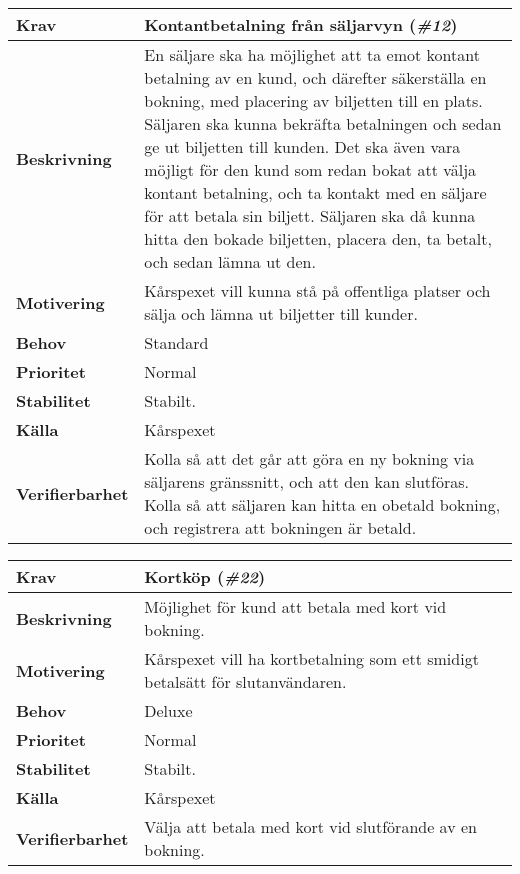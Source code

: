 \documentclass[a4paper, twoside, 11pt, titlepage]{article}
\begin{document}
		\begin{tabular} { p{2.6cm} p{12.5cm} }
			\hline
			\sffamily\textbf{Krav} & Kontantbetalning från säljarvyn (\emph{\#12})  \\
			\hline
			\sffamily\textbf{Beskrivning} & En säljare ska ha möjlighet att ta emot kontant betalning av en kund, och därefter säkerställa en bokning, med placering av biljetten till en plats. Säljaren ska kunna bekräfta betalningen och sedan ge ut biljetten till kunden. Det ska även vara möjligt för den kund som redan bokat att välja kontant betalning, och ta kontakt med en säljare för att betala sin biljett. Säljaren ska då kunna hitta den bokade biljetten, placera den, ta betalt, och sedan lämna ut den.  \\
			\hline
			\sffamily\textbf{Motivering} & Kårspexet vill kunna stå på offentliga platser och sälja och lämna ut biljetter till kunder.  \\
			\hline
			\sffamily\textbf{Behov} & Standard  \\
			\hline
			\sffamily\textbf{Prioritet} & Normal  \\
			\hline
			\sffamily\textbf{Stabilitet} & Stabilt.  \\
			\hline
			\sffamily\textbf{Källa} & Kårspexet  \\
			\hline
			\sffamily\textbf{Verifierbarhet} & Kolla så att det går att göra en ny bokning via säljarens gränssnitt, och att den kan slutföras. Kolla så att säljaren kan hitta en obetald bokning, och registrera att bokningen är betald.  \\
			\hline
		\end{tabular}
		\vspace{6mm}

		\begin{tabular} { p{2.6cm} p{12.5cm} }
			\hline
			\sffamily\textbf{Krav} & Kortköp (\emph{\#22})  \\
			\hline
			\sffamily\textbf{Beskrivning} & Möjlighet för kund att betala med kort vid bokning.  \\
			\hline
			\sffamily\textbf{Motivering} & Kårspexet vill ha kortbetalning som ett smidigt betalsätt för slutanvändaren.  \\
			\hline
			\sffamily\textbf{Behov} & Deluxe  \\
			\hline
			\sffamily\textbf{Prioritet} & Normal  \\
			\hline
			\sffamily\textbf{Stabilitet} & Stabilt.  \\
			\hline
			\sffamily\textbf{Källa} & Kårspexet  \\
			\hline
			\sffamily\textbf{Verifierbarhet} & Välja att betala med kort vid slutförande av en bokning.  \\
			\hline
		\end{tabular}
		\vspace{6mm}
\end{document}
